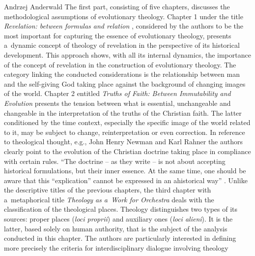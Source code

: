 \begin{newrevengenv}{Andrzej Anderwald}
The first part, consisting of five chapters, discusses the methodological assumptions of evolutionary theology. Chapter 1 under the title \textit{Revelation: between formulas and relation} 
\parencite*[][pp.16–37]{grygiel_teologia_2022}, %
 considered by the authors to be the most important for capturing the essence of evolutionary theology, presents a~dynamic concept of theology of revelation in the perspective of its historical development. This approach shows, with all its internal dynamics, the importance of the concept of revelation in the construction of evolutionary theology. The category linking the conducted considerations is the relationship between man and the self-giving God taking place against the background of changing images of the world. Chapter 2 entitled \textit{Truths of Faith: Between Immutability and Evolution} 
\parencite*[][pp.38–60]{grygiel_teologia_2022} %
 presents the tension between what is essential, unchangeable and changeable in the interpretation of the truths of the Christian faith. The latter conditioned by the time context, especially the specific image of the world related to it, may be subject to change, reinterpretation or even correction. In reference to theological thought, e.g., John Henry Newman 
\parencite*[][pp.43–44]{grygiel_teologia_2022} %
 and Karl Rahner 
\parencite*[][pp.50–51]{grygiel_teologia_2022} %
 the authors clearly point to the evolution of the Christian doctrine taking place in compliance with certain rules. ``The doctrine -- as they write -- is not about accepting historical formulations, but their inner essence. At the same time, one should be aware that this ``explication'' cannot be expressed in an ahistorical way'' 
\parencite*[][p.51]{grygiel_teologia_2022}. %
 Unlike the descriptive titles of the previous chapters, the third chapter with a~metaphorical title \textit{Theology as a~Work for Orchestra} 
\parencite*[][pp.61–84]{grygiel_teologia_2022} %
 deals with the classification of the theological places. Theology distinguishes two types of its sources: proper places (\textit{loci proprii}) and auxiliary ones (\textit{loci alieni}). It is the latter, based solely on human authority, that is the subject of the analysis conducted in this chapter. The authors are particularly interested in defining more precisely the criteria for interdisciplinary dialogue involving theology 

\end{newrevengenv}
